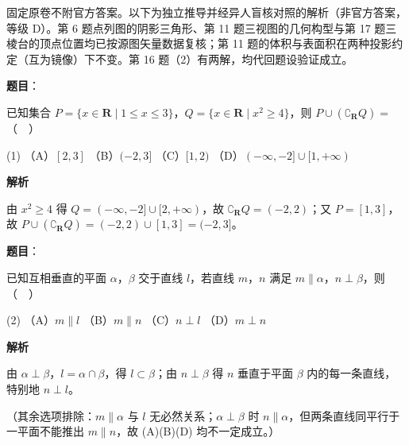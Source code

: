 

\begin{gktip}
固定原卷不附官方答案。以下为独立推导并经异人盲核对照的解析（非官方答案，等级 D）。第 6 题点列图的阴影三角形、第 11 题三视图的几何构型与第 17 题三棱台的顶点位置均已按源图矢量数据复核；第 11 题的体积与表面积在两种投影约定（互为镜像）下不变。第 16 题（2）有两解，均代回题设验证成立。
\end{gktip}

\begin{answer}

\textbf{题目}：

已知集合 \(P=\{x\in\mathbf{R}\mid 1\leqslant x\leqslant 3\}\)，\(Q=\{x\in\mathbf{R}\mid x^{2}\geqslant 4\}\)，则 \(P\cup(\complement_{\mathbf{R}}Q)=\)（　）

\begin{gkopts}(1)
\task （A）\([2,3]\)
\task （B）\((-2,3]\)
\task （C）\([1,2)\)
\task （D）\((-\infty,-2]\cup[1,+\infty)\)
\end{gkopts}

\textbf{解析}

由 \(x^{2}\geqslant 4\) 得 \(Q=(-\infty,-2]\cup[2,+\infty)\)，故 \(\complement_{\mathbf{R}}Q=(-2,2)\)；又 \(P=[1,3]\)，故 \(P\cup(\complement_{\mathbf{R}}Q)=(-2,2)\cup[1,3]=(-2,3]\)。

\gkanswer{答案：B，\((-2,3]\)}

\end{answer}
\begin{answer}

\textbf{题目}：

已知互相垂直的平面 \(\alpha\)，\(\beta\) 交于直线 \(l\)，若直线 \(m\)，\(n\) 满足 \(m\parallel\alpha\)，\(n\perp\beta\)，则（　）

\begin{gkopts}(2)
\task （A）\(m\parallel l\)
\task （B）\(m\parallel n\)
\task （C）\(n\perp l\)
\task （D）\(m\perp n\)
\end{gkopts}

\textbf{解析}

由 \(\alpha\perp\beta\)，\(l=\alpha\cap\beta\)，得 \(l\subset\beta\)；由 \(n\perp\beta\) 得 \(n\) 垂直于平面 \(\beta\) 内的每一条直线，特别地 \(n\perp l\)。

（其余选项排除：\(m\parallel\alpha\) 与 \(l\) 无必然关系；\(\alpha\perp\beta\) 时 \(n\parallel\alpha\)，但两条直线同平行于一平面不能推出 \(m\parallel n\)，故 (A)(B)(D) 均不一定成立。）


\end{answer}

